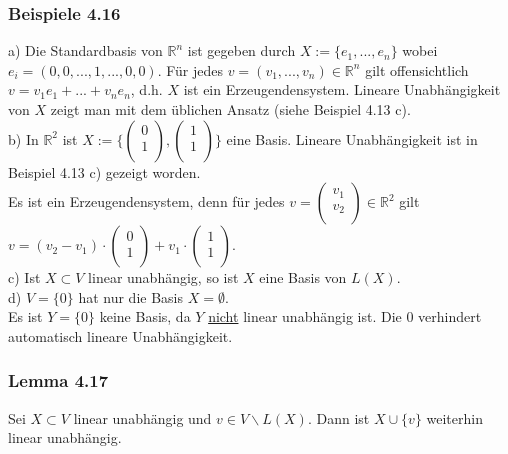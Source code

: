 \documentclass{article}
\begin{document}
\subsubsection*{Beispiele 4.16}
a) Die Standardbasis von $\mathbb{R}^n$ ist gegeben durch $X:= \{e_1,...,e_n\}$ wobei $e_i = (0, 0, ..., 1, ..., 0,0)$. Für jedes $v = (v_1,...,v_n) \in \mathbb{R}^n$ gilt offensichtlich $v = v_1 e_1 + ... + v_n e_n$, d.h. $X$ ist ein Erzeugendensystem. 
Lineare Unabhängigkeit von $X$ zeigt man mit dem üblichen Ansatz (siehe Beispiel 4.13 c). \\
b) In $\mathbb{R}^2$ ist $X := \{ \begin{pmatrix}
    0 \\
    1 \\
    \end{pmatrix}, \begin{pmatrix}
        1 \\
        1 \\
    \end{pmatrix} \}$ eine Basis. Lineare Unabhängigkeit ist in Beispiel 4.13 c) gezeigt worden. \\
Es ist ein Erzeugendensystem, denn für jedes $v = \begin{pmatrix}
    v_1 \\
    v_2 \\
    \end{pmatrix} \in \mathbb{R}^2$ gilt $v = (v_2 - v_1) \cdot \begin{pmatrix}
        0 \\
        1 \\
    \end{pmatrix} + v_1 \cdot \begin{pmatrix}
        1 \\
        1 \\
    \end{pmatrix}$. \\
c) Ist $X \subset V$ linear unabhängig, so ist $X$ eine Basis von $L(X)$. \\
d) $V = \{0\}$ hat nur die Basis $X = \emptyset$. \\
Es ist $Y = \{0\}$ keine Basis, da $Y$ \underline{nicht} linear unabhängig ist. Die 0 verhindert automatisch lineare Unabhängigkeit. \\

\subsubsection*{Lemma 4.17}
Sei $X \subset V$ linear unabhängig und $v \in V \backslash L(X)$. Dann ist $X \cup \{v\}$ weiterhin linear unabhängig. \\
\\
\end{document}
